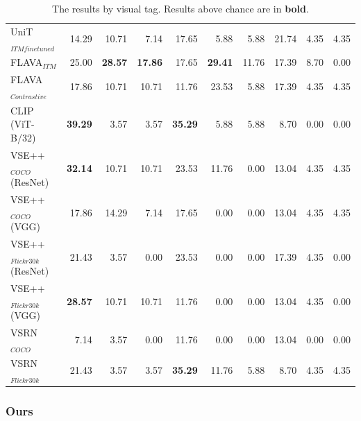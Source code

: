 \begin{table}[ht]
\begin{adjustbox}{max width=\textwidth}
\begin{tabular}{l|rrr|rrr|rrr}
 UniT$_{ITM finetuned}$       & 14.29          & 10.71          & 7.14           & 17.65          & 5.88           & 5.88           & 21.74          & 4.35           & 4.35           \\
 FLAVA$_{ITM}$                & 25.00          & \textbf{28.57} & \textbf{17.86} & 17.65          & \textbf{29.41} & 11.76 & 17.39          &  8.70 &  0.00 \\
 FLAVA$_{Contrastive}$        & 17.86          & 10.71          & 10.71          & 11.76          & 23.53          & 5.88           & 17.39          & 4.35           &  4.35 \\
 CLIP (ViT-B/32)              & \textbf{39.29} & 3.57           & 3.57           & \textbf{35.29} & 5.88           & 5.88           & 8.70           & 0.00           & 0.00           \\
 VSE++$_{COCO}$ (ResNet)      & \textbf{32.14} & 10.71          & 10.71          & 23.53          & 11.76          & 0.00           & 13.04          & 4.35           & 4.35           \\
 VSE++$_{COCO}$ (VGG)         & 17.86          & 14.29          & 7.14           & 17.65          & 0.00           & 0.00           & 13.04          & 4.35           & 4.35           \\
 VSE++$_{Flickr30k}$ (ResNet) & 21.43          & 3.57           & 0.00           & 23.53          & 0.00           & 0.00           & 17.39          & 4.35           & 0.00           \\
 VSE++$_{Flickr30k}$ (VGG)    & \textbf{28.57} & 10.71          & 10.71          & 11.76          & 0.00           & 0.00           & 13.04          & 4.35           & 0.00           \\
 VSRN$_{COCO}$                & 7.14           & 3.57           & 0.00           & 11.76          & 0.00           & 0.00           & 13.04          & 0.00           & 0.00           \\
 VSRN$_{Flickr30k}$           & 21.43          & 3.57           & 3.57           & \textbf{35.29} & 11.76          & 5.88           & 8.70           & 4.35           & 4.35           \\
    \bottomrule
  \end{tabular}
  \end{adjustbox}
  \caption{The results by visual tag. Results above chance are in \textbf{bold}.}
    \label{tab:results-by-visual-tag-baseline}
\end{table}

\subsubsection{Ours}

